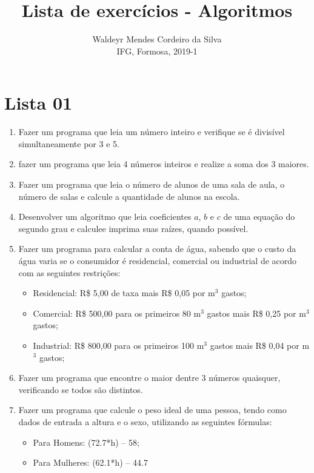 \documentclass[a4paper]{article}
\title{Lista de exercícios - Algoritmos}
\author{Waldeyr Mendes Cordeiro da Silva\\IFG, Formosa, 2019-1}
\begin{document}
\maketitle

\section{Lista 01}

\begin{enumerate}
	\item Fazer um programa que leia um número inteiro e verifique se é divisível simultaneamente por 3 e 5.
	\item fazer um programa que leia 4 números inteiros e realize a soma dos 3 maiores.
	\item Fazer um programa que leia o número de alunos de uma sala de aula, o número de salas e calcule a quantidade de alunos na escola.
	\item Desenvolver um algoritmo que leia coeficientes $a$, $b$ e $c$ de uma equação do segundo grau e calculee imprima suas raízes, quando possível.
	\item Fazer um programa para calcular a conta de água, sabendo que o custo da água varia se o consumidor é residencial, comercial ou industrial de acordo com as seguintes restrições:
	\begin{itemize}
		\item Residencial: R\$ 5,00 de taxa mais R\$ 0,05 por m$^3$ gastos;
		\item Comercial: R\$ 500,00 para os primeiros 80 m$^3$ gastos mais R\$ 0,25 por m$^3$ gastos;
		\item Industrial: R\$ 800,00 para os primeiros 100 m$^3$ gastos mais R\$ 0,04 por m$^3$ gastos;
	\end{itemize}
	\item Fazer um programa que encontre o maior dentre 3 números quaisquer, verificando se todos são distintos.
	\item Fazer um programa que calcule o peso ideal de uma pessoa, tendo como dados de entrada a altura e o sexo, utilizando as seguintes fórmulas:
	\begin{itemize}
		\item Para Homens: (72.7*h) – 58;
		\item Para Mulheres: (62.1*h) – 44.7
	\end{itemize}
\end{enumerate}
\end{document}
